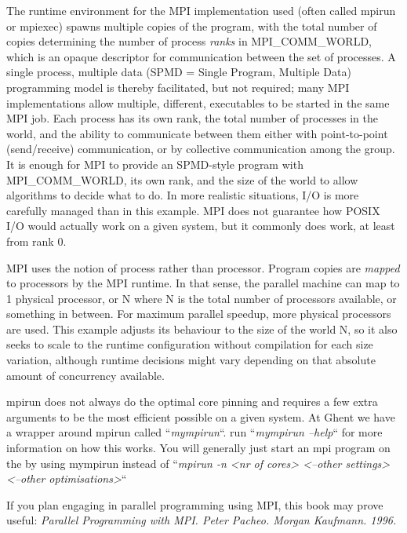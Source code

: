 The runtime environment for the MPI implementation used (often called mpirun or
mpiexec) spawns multiple copies of the program, with the total number of copies
determining the number of process \emph{ranks} in MPI\_COMM\_WORLD, which is
an opaque descriptor for communication between the set of processes. A single
process, multiple data (SPMD = Single Program, Multiple Data) programming model
is thereby facilitated, but not required; many MPI implementations allow
multiple, different, executables to be started in the same MPI job. Each
process has its own rank, the total number of processes in the world, and the
ability to communicate between them either with point-to-point (send/receive)
communication, or by collective communication among the group. It is enough for
MPI to provide an SPMD-style program with MPI\_COMM\_WORLD, its own rank, and
the size of the world to allow algorithms to decide what to do. In more
realistic situations, I/O is more carefully managed than in this example. MPI
does not guarantee how POSIX I/O would actually work on a given system, but it
commonly does work, at least from rank 0.

MPI uses the notion of process rather than processor. Program copies are
\emph{mapped} to processors by the MPI runtime. In that sense, the parallel
machine can map to 1 physical processor, or N where N is the total number of
processors available, or something in between. For maximum parallel speedup,
more physical processors are used. This example adjusts its behaviour to the
size of the world N, so it also seeks to scale to the runtime configuration
without compilation for each size variation, although runtime decisions might
vary depending on that absolute amount of concurrency available.

\ifgent
\begin{tip}
mpirun does not always do the optimal core pinning and requires a few extra
arguments to be the most efficient possible on a given system. At Ghent we have
a wrapper around mpirun called ``\emph{mympirun}``. run ``\emph{mympirun --help}``
for more information on how this works.
You will generally just start an mpi program on the \hpcInfra by using mympirun
instead of ``\emph{mpirun -n <nr of cores> <--other settings> <--other optimisations>}``
\end{tip}
\fi

\begin{tip}
If you plan engaging in parallel programming using MPI, this
book may prove useful: \emph{Parallel Programming with MPI. Peter Pacheo.
Morgan Kaufmann. 1996.}
\end{tip}
